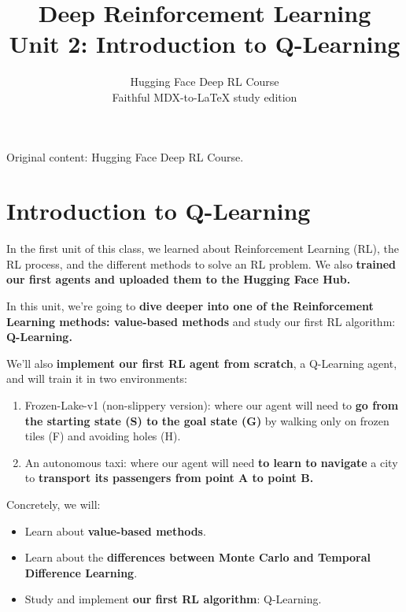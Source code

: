 \documentclass[11pt,a4paper]{article}
\title{\textbf{Deep Reinforcement Learning}\\[0.35em]\large Unit 2: Introduction to Q-Learning}
\author{Hugging Face Deep RL Course\\\small Faithful MDX-to-\LaTeX{} study edition}
\date{}
\begin{document}
\maketitle
\vspace{-0.8em}
\begin{center}\small\color{secondary}Original content: Hugging Face Deep RL Course.\end{center}
\tableofcontents
\vspace{1em}
\clearpage
\section{Introduction to Q-Learning}\label{introduction-to-q-learning}


In the first unit of this class, we learned about Reinforcement Learning (RL), the RL process, and the different methods to solve an RL problem. We also \textbf{trained our first agents and uploaded them to the Hugging Face Hub.}

In this unit, we're going to \textbf{dive deeper into one of the Reinforcement Learning methods: value-based methods} and study our first RL algorithm: \textbf{Q-Learning.}

We'll also \textbf{implement our first RL agent from scratch}, a Q-Learning agent, and will train it in two environments:

\begin{enumerate}
\def\labelenumi{\arabic{enumi}.}
\tightlist
\item
  Frozen-Lake-v1 (non-slippery version): where our agent will need to \textbf{go from the starting state (S) to the goal state (G)} by walking only on frozen tiles (F) and avoiding holes (H).
\item
  An autonomous taxi: where our agent will need \textbf{to learn to navigate} a city to \textbf{transport its passengers from point A to point B.}
\end{enumerate}


Concretely, we will:

\begin{itemize}
\tightlist
\item
  Learn about \textbf{value-based methods}.
\item
  Learn about the \textbf{differences between Monte Carlo and Temporal Difference Learning}.
\item
  Study and implement \textbf{our first RL algorithm}: Q-Learning.
\end{itemize}
\end{document}
